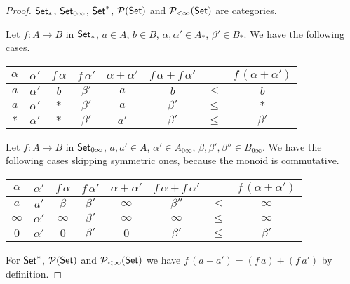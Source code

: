 \documentclass[runningheads,envcountsame]{llncs}
\begin{document}
\begin{proof}
    $\mathsf{Set}_*$, $\mathsf{Set}_{0\infty}$, $\mathsf{Set}^*$, $\mathcal{P}(\mathsf{Set})$ and $\mathcal{P}_{<\infty}(\mathsf{Set})$ are categories.
    
    Let $f\colon A \to B$ in $\mathsf{Set}_*$, $a \in A$, $b \in B$, $\alpha, \alpha' \in A_*$, $\beta' \in B_*$. We have the following cases.
    \begin{center}
    \begin{tabular}{c|c|c|c||c||ccc}
    \hline
    $\alpha$ & $\alpha'$ & $f\,\alpha$ & $f\,\alpha'$ & $\alpha + \alpha'$ & $f\,\alpha + f\,\alpha'$ & & $f\,(\alpha +\alpha')$ \\
    \hline
    $a$ & $\alpha'$ & $b$ & $\beta'$ & $a$ & $b$ & $\leq$ & $b$ \\
    $a$ & $\alpha'$ & $*$ & $\beta'$ & $a$ & $\beta'$ & $\leq$ & $*$ \\
    $*$ & $\alpha'$ & $*$ & $\beta'$ & $a'$ & $\beta'$ & $\leq$ & $\beta'$
    \end{tabular}
    \end{center}
    
    Let $f\colon A \to B$ in $\mathsf{Set}_{0\infty}$, $a, a' \in A$, $\alpha' \in A_{0\infty}$, $\beta, \beta', \beta'' \in B_{0\infty}$. We have the following cases skipping
    symmetric ones, because the monoid is commutative.
    \begin{center}
    \begin{tabular}{c|c|c|c||c||ccc}
    \hline
    $\alpha$ & $\alpha'$ & $f\,\alpha$ & $f\,\alpha'$ & $\alpha + \alpha'$ & $f\,\alpha + f\,\alpha'$ & & $f\,(\alpha +\alpha')$ \\
    \hline
    $a$ & $a'$ & $\beta$ & $\beta'$ & $\infty$ & $\beta''$ & $\leq$ & $\infty$ \\
    $\infty$ & $\alpha'$ & $\infty$ & $\beta'$ & $\infty$ & $\infty$ & $\leq$ & $\infty$ \\
    $0$ & $\alpha'$ & $0$ & $\beta'$ & $0$ & $\beta'$ & $\leq$ & $\beta'$ \\
    \end{tabular}
    \end{center}
    
    For $\mathsf{Set}^*$, $\mathcal{P}(\mathsf{Set})$ and $\mathcal{P}_{<\infty}(\mathsf{Set})$ we have $f\,(a + a') = (f\,a) + (f\,a')$ by definition.
\end{proof}
\end{document}
